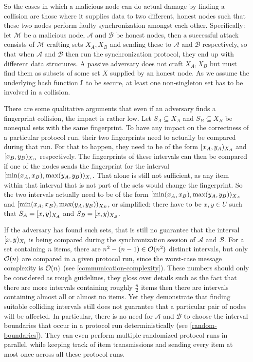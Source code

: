 So the cases in which a malicious node can do actual damage by finding a collision are those where it supplies data to two different, honest nodes such that these two nodes perform faulty synchronization amongst each other. Specifically: let $\mathcal{M}$ be a malicious node, $\mathcal{A}$ and $\mathcal{B}$ be honest nodes, then a successful attack consists of $\mathcal{M}$ crafting sets $X_A, X_B$ and sending these to $\mathcal{A}$ and $\mathcal{B}$ respectively, so that when $\mathcal{A}$ and $\mathcal{B}$ then run the synchronization protocol, they end up with different data structures. A passive adversary does not craft $X_A, X_B$ but must find them as subsets of some set $X$ supplied by an honest node. As we assume the underlying hash function $\operatorname{f}$ to be secure, at least one non-singleton set has to be involved in a collision.

There are some qualitative arguments that even if an adversary finds a fingerprint collision, the impact is rather low. Let $S_A \subseteq X_A$ and $S_B \subseteq X_B$ be nonequal sets with the same fingerprint. To have any impact on the correctness of a particular protocol run, their two fingerprints need to actually be compared during that run. For that to happen, they need to be of the form $[{x_A},{y_A})_{X_A}$ and $[{x_B},{y_B})_{X_B}$ respectively. The fingerprints of these intervals can then be compared if one of the nodes sends the fingerprint for the interval $[{\min(x_A, x_B)},{\max(y_A, y_B)})_{X_i}$. That alone is still not sufficient, as any item within that interval that is not part of the sets would change the fingerprint. So the two intervals actually need to be of the form $[{\min(x_A, x_B)},{\max(y_A, y_B)})_{X_A}$ and $[{\min(x_A, x_B)},{\max(y_A, y_B)})_{X_B}$, or simplified: there have to be $x, y \in U$ such that $S_A = [{x},{y})_{X_A}$ and $S_B = [{x},{y})_{X_B}$.

\label{why-random-boundaries}
If the adversary has found such sets, that is still no guarantee that the interval $[{x},{y})_{X_i}$ is being compared during the synchronization session of $\mathcal{A}$ and $\mathcal{B}$. For a set containing $n$ items, there are $n^2 - (n - 1) \in \mathcal{O}(n^2)$ distinct intervals, but only $\mathcal{O}(n)$ are compared in a given protocol run, since the worst-case message complexity is $\mathcal{O}(n)$ (see \cref{communication-complexity}). These numbers should only be considered as rough guidelines, they gloss over details such as the fact that there are more intervals containing roughly $\frac{n}{2}$ items then there are intervals containing almost all or almost no items. Yet they demonstrate that finding suitable colliding intervals still does not guarantee that a particular pair of nodes will be affected. In particular, there is no need for $\mathcal{A}$ and $\mathcal{B}$ to choose the interval boundaries that occur in a protocol run deterministically (see \cref{random-boundaries}). They can even perform multiple randomized protocol runs in parallel, while keeping track of item transmissions and sending every item at most once across all these protocol runs.

